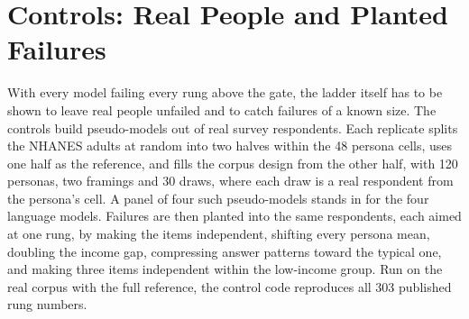
\section{Controls: Real People and Planted Failures}
\label{sec:controls}

With every model failing every rung above the gate, the ladder itself has to be shown to leave real people unfailed and to catch failures of a known size.
The controls build pseudo-models out of real survey respondents.
Each replicate splits the NHANES adults at random into two halves within the 48 persona cells, uses one half as the reference, and fills the corpus design from the other half, with 120 personas, two framings and 30 draws, where each draw is a real respondent from the persona's cell.
A panel of four such pseudo-models stands in for the four language models.
Failures are then planted into the same respondents, each aimed at one rung, by making the items independent, shifting every persona mean, doubling the income gap, compressing answer patterns toward the typical one, and making three items independent within the low-income group.
Run on the real corpus with the full reference, the control code reproduces all 303 published rung numbers. %


\FloatBarrier

